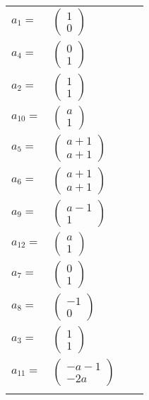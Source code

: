 \documentclass[1p]{elsarticle_modified}
\theoremstyle{definition}
\begin{document}
\begin{tabular}{m{7pt} m{180pt} m{7pt} m{180pt} }
\flushright $a_{1}=$&$\begin{pmatrix}1\\0\end{pmatrix}$ \\
\flushright $a_{4}=$&$\begin{pmatrix}0\\1\end{pmatrix}$ \\
\flushright $a_{2}=$&$\begin{pmatrix}1\\1\end{pmatrix}$ \\
\flushright $a_{10}=$&$\begin{pmatrix}a\\1\end{pmatrix}$ \\
\flushright $a_{5}=$&$\begin{pmatrix}a+1\\a+1\end{pmatrix}$ \\
\flushright $a_{6}=$&$\begin{pmatrix}a+1\\a+1\end{pmatrix}$ \\
\flushright $a_{9}=$&$\begin{pmatrix}a-1\\1\end{pmatrix}$ \\
\flushright $a_{12}=$&$\begin{pmatrix}a\\1\end{pmatrix}$ \\
\flushright $a_{7}=$&$\begin{pmatrix}0\\1\end{pmatrix}$ \\
\flushright $a_{8}=$&$\begin{pmatrix}-1\\0\end{pmatrix}$ \\
\flushright $a_{3}=$&$\begin{pmatrix}1\\1\end{pmatrix}$ \\
\flushright $a_{11}=$&$\begin{pmatrix}- a-1\\-2 a\end{pmatrix}$\\&\end{tabular}
\end{document}
